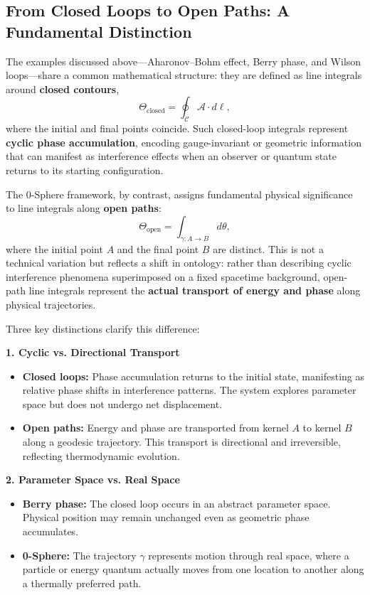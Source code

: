\documentclass[12pt,letterpaper]{article}
\begin{document}
\subsection{From Closed Loops to Open Paths: A Fundamental Distinction}
\label{subsec:open_paths}

The examples discussed above—Aharonov--Bohm effect, Berry phase, and Wilson loops—share a common mathematical structure: they are defined as line integrals around \textbf{closed contours},
\begin{equation}
\Theta_{\mathrm{closed}} = \oint_{\mathcal{C}} \mathcal{A} \cdot d\bm{\ell},
\end{equation}
where the initial and final points coincide. Such closed-loop integrals represent \textbf{cyclic phase accumulation}, encoding gauge-invariant or geometric information that can manifest as interference effects when an observer or quantum state returns to its starting configuration.

The 0-Sphere framework, by contrast, assigns fundamental physical significance to line integrals along \textbf{open paths}:
\begin{equation}
\Theta_{\mathrm{open}} = \int_{\gamma: A \to B} d\theta,
\end{equation}
where the initial point $A$ and the final point $B$ are distinct. This is not a technical variation but reflects a shift in ontology: rather than describing cyclic interference phenomena superimposed on a fixed spacetime background, open-path line integrals represent the \textbf{actual transport of energy and phase} along physical trajectories.

Three key distinctions clarify this difference:

\textbf{1. Cyclic vs. Directional Transport}
\begin{itemize}
\item \textbf{Closed loops:} Phase accumulation returns to the initial state, manifesting as relative phase shifts in interference patterns. The system explores parameter space but does not undergo net displacement.
\item \textbf{Open paths:} Energy and phase are transported from kernel $A$ to kernel $B$ along a geodesic trajectory. This transport is directional and irreversible, reflecting thermodynamic evolution.
\end{itemize}

\textbf{2. Parameter Space vs. Real Space}
\begin{itemize}
\item \textbf{Berry phase:} The closed loop occurs in an abstract parameter space. Physical position may remain unchanged even as geometric phase accumulates.
\item \textbf{0-Sphere:} The trajectory $\gamma$ represents motion through real space, where a particle or energy quantum actually moves from one location to another along a thermally preferred path.
\end{itemize}
\end{document}
